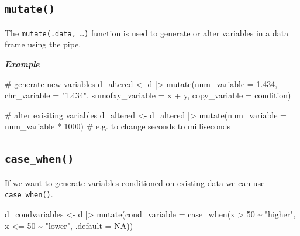 \documentclass[
  letterpaper,
  DIV=11,
  numbers=noendperiod,
  oneside]{scrreprt}
\newenvironment{Shaded}{\begin{snugshade}}{\end{snugshade}}
\newcommand{\AttributeTok}[1]{\textcolor[rgb]{0.40,0.45,0.13}{#1}}
\newcommand{\CommentTok}[1]{\textcolor[rgb]{0.37,0.37,0.37}{#1}}
\newcommand{\ConstantTok}[1]{\textcolor[rgb]{0.56,0.35,0.01}{#1}}
\newcommand{\DecValTok}[1]{\textcolor[rgb]{0.68,0.00,0.00}{#1}}
\newcommand{\FloatTok}[1]{\textcolor[rgb]{0.68,0.00,0.00}{#1}}
\newcommand{\FunctionTok}[1]{\textcolor[rgb]{0.28,0.35,0.67}{#1}}
\newcommand{\NormalTok}[1]{\textcolor[rgb]{0.00,0.23,0.31}{#1}}
\newcommand{\OtherTok}[1]{\textcolor[rgb]{0.00,0.23,0.31}{#1}}
\newcommand{\SpecialCharTok}[1]{\textcolor[rgb]{0.37,0.37,0.37}{#1}}
\newcommand{\StringTok}[1]{\textcolor[rgb]{0.13,0.47,0.30}{#1}}
\begin{document}
\hypertarget{mutate}{%
\subsection{\texorpdfstring{\texttt{mutate()}}{mutate()}}\label{mutate}}

The \texttt{mutate(.data,\ …)} function is used to generate or alter
variables in a data frame using the pipe.

\textbf{\emph{Example}}

\begin{Shaded}
\begin{Highlighting}[]
\CommentTok{\# generate new variables}
\NormalTok{d\_altered }\OtherTok{\textless{}{-}}\NormalTok{ d }\SpecialCharTok{|\textgreater{}}
    \FunctionTok{mutate}\NormalTok{(}\AttributeTok{num\_variable =} \FloatTok{1.434}\NormalTok{,}
           \AttributeTok{chr\_variable =} \StringTok{"1.434"}\NormalTok{,}
           \AttributeTok{sumofxy\_variable =}\NormalTok{ x }\SpecialCharTok{+}\NormalTok{ y,}
           \AttributeTok{copy\_variable =}\NormalTok{ condition)}

\CommentTok{\# alter exisiting variables}
\NormalTok{d\_altered }\OtherTok{\textless{}{-}}\NormalTok{ d\_altered }\SpecialCharTok{|\textgreater{}}
    \FunctionTok{mutate}\NormalTok{(}\AttributeTok{num\_variable =}\NormalTok{ num\_variable }\SpecialCharTok{*} \DecValTok{1000}\NormalTok{) }\CommentTok{\# e.g. to change seconds to milliseconds}
\end{Highlighting}
\end{Shaded}

\hypertarget{case_when}{%
\subsection{\texorpdfstring{\texttt{case\_when()}}{case\_when()}}\label{case_when}}

If we want to generate variables conditioned on existing data we can use
\texttt{case\_when()}.

\begin{Shaded}
\begin{Highlighting}[]
\NormalTok{d\_condvariables }\OtherTok{\textless{}{-}}\NormalTok{ d }\SpecialCharTok{|\textgreater{}}
    \FunctionTok{mutate}\NormalTok{(}\AttributeTok{cond\_variable =} \FunctionTok{case\_when}\NormalTok{(x }\SpecialCharTok{\textgreater{}} \DecValTok{50} \SpecialCharTok{\textasciitilde{}} \StringTok{"higher"}\NormalTok{,}
\NormalTok{                                     x }\SpecialCharTok{\textless{}=} \DecValTok{50} \SpecialCharTok{\textasciitilde{}} \StringTok{"lower"}\NormalTok{,}
                                     \AttributeTok{.default =} \ConstantTok{NA}\NormalTok{))}
\end{Highlighting}
\end{Shaded}
\end{document}

